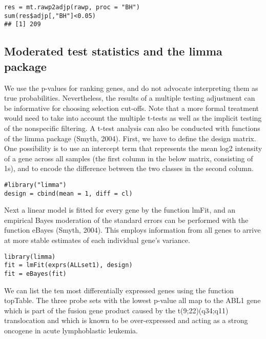 \begin{verbatim}
res = mt.rawp2adjp(rawp, proc = "BH")
sum(res$adjp[,"BH"]<0.05)
## [1] 209
\end{verbatim}

\hypertarget{moderated-test-statistics-and-the-limma-package}{%
\subsection{Moderated test statistics and the limma
package}\label{moderated-test-statistics-and-the-limma-package}}

We use the p-values for ranking genes, and do not advocate interpreting
them as true probabilities. Nevertheless, the results of a multiple
testing adjustment can be informative for choosing selection cut-offs.
Note that a more formal treatment would need to take into account the
multiple t-tests as well as the implicit testing of the nonspecific
filtering. A t-test analysis can also be conducted with functions of the
limma package (Smyth, 2004). First, we have to define the design matrix.
One possibility is to use an intercept term that represents the mean
log2 intensity of a gene across all samples (the first column in the
below matrix, consisting of 1s), and to encode the difference between
the two classes in the second column.

\begin{verbatim}
#library("limma")
design = cbind(mean = 1, diff = cl)
\end{verbatim}

Next a linear model is fitted for every gene by the function lmFit, and
an empirical Bayes moderation of the standard errors can be performed
with the function eBayes (Smyth, 2004). This employs information from
all genes to arrive at more stable estimates of each individual gene's
variance.

\begin{verbatim}
library(limma)
fit = lmFit(exprs(ALLset1), design)
fit = eBayes(fit)
\end{verbatim}

We can list the ten most differentially expressed genes using the
function topTable. The three probe sets with the lowest p-value all map
to the ABL1 gene which is part of the fusion gene product caused by the
t(9;22)(q34;q11) translocation and which is known to be over-expressed
and acting as a strong oncogene in acute lymphoblastic leukemia.

